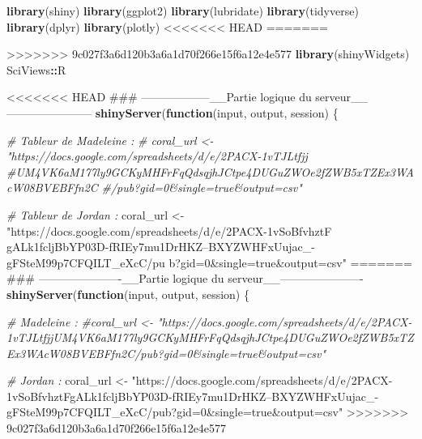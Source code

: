 \documentclass[]{report}
\newenvironment{Shaded}{\begin{snugshade}}{\end{snugshade}}
\newcommand{\KeywordTok}[1]{\textcolor[rgb]{0.13,0.29,0.53}{\textbf{#1}}}
\newcommand{\StringTok}[1]{\textcolor[rgb]{0.31,0.60,0.02}{#1}}
\newcommand{\CommentTok}[1]{\textcolor[rgb]{0.56,0.35,0.01}{\textit{#1}}}
\newcommand{\ControlFlowTok}[1]{\textcolor[rgb]{0.13,0.29,0.53}{\textbf{#1}}}
\newcommand{\OperatorTok}[1]{\textcolor[rgb]{0.81,0.36,0.00}{\textbf{#1}}}
\newcommand{\NormalTok}[1]{#1}
\begin{document}
\begin{Shaded}
\begin{Highlighting}[]
\KeywordTok{library}\NormalTok{(shiny)}
\KeywordTok{library}\NormalTok{(ggplot2)}
\KeywordTok{library}\NormalTok{(lubridate)}
\KeywordTok{library}\NormalTok{(tidyverse)}
\KeywordTok{library}\NormalTok{(dplyr)}
\KeywordTok{library}\NormalTok{(plotly)}
<<<<<<< HEAD
=======


>>>>>>> 9c027f3a6d120b3a6a1d70f266e15f6a12e4e577
\KeywordTok{library}\NormalTok{(shinyWidgets)}
\NormalTok{SciViews}\OperatorTok{::}\NormalTok{R}



<<<<<<< HEAD
\NormalTok{### ------------------__Partie logique du serveur__-----------------------}
\KeywordTok{shinyServer}\NormalTok{(}\ControlFlowTok{function}\NormalTok{(input, output, session) \{}

  \CommentTok{# Tableur de Madeleine :}
  \CommentTok{# coral_url <- "https://docs.google.com/spreadsheets/d/e/2PACX-1vTJLtfjj}
  \CommentTok{#UM4VK6aM177ly9GCKyMHFrFqQdsqjhJCtpe4DUGuZWOe2fZWB5xTZEx3WAcW08BVEBFfn2C}
  \CommentTok{#/pub?gid=0&single=true&output=csv"}

  \CommentTok{# Tableur de Jordan :}
\NormalTok{  coral_url <-}\StringTok{ "https://docs.google.com/spreadsheets/d/e/2PACX-1vSoBfvhztF}
\StringTok{  gALk1fcljBbYP03D-fRIEy7mu1DrHKZ--BXYZWHFxUujac_-gFSteM99p7CFQILT_eXcC/pu}
\StringTok{  b?gid=0&single=true&output=csv"}
=======
\NormalTok{### ----------------------__Partie logique du serveur__----------------------}
\KeywordTok{shinyServer}\NormalTok{(}\ControlFlowTok{function}\NormalTok{(input, output, session) \{}

  \CommentTok{# Madeleine :}
  \CommentTok{#coral_url <- "https://docs.google.com/spreadsheets/d/e/2PACX-1vTJLtfjjUM4VK6aM177ly9GCKyMHFrFqQdsqjhJCtpe4DUGuZWOe2fZWB5xTZEx3WAcW08BVEBFfn2C/pub?gid=0&single=true&output=csv"}

  \CommentTok{# Jordan :}
\NormalTok{  coral_url <-}\StringTok{ "https://docs.google.com/spreadsheets/d/e/2PACX-1vSoBfvhztFgALk1fcljBbYP03D-fRIEy7mu1DrHKZ--BXYZWHFxUujac_-gFSteM99p7CFQILT_eXcC/pub?gid=0&single=true&output=csv"}
>>>>>>> 9c027f3a6d120b3a6a1d70f266e15f6a12e4e577


\end{Highlighting}
\end{Shaded}
\end{document}
